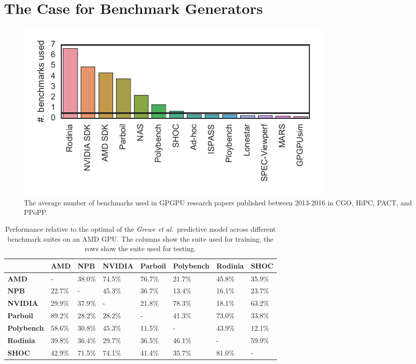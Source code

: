 \section{The Case for Benchmark Generators}%
\label{subsec:the-case-for-benchmark-generators}

\begin{figure}[t]
  \includegraphics[width=\columnwidth]{img/motivation-c} %
  \caption{%
    The average number of benchmarks used in GPGPU research papers published between 2013-2016 in CGO, HiPC, PACT, and PPoPP.%
  }%
  \label{fig:benchmark-suite-distribution}
\end{figure}

\begin{table}
  \centering%
  \begin{tabular}{ R{1.5cm} C{1.5cm} C{1.5cm} C{1.5cm} C{1.5cm} C{1.5cm} C{1.5cm} C{1.5cm} }
    \toprule
    & \textbf{AMD} & \textbf{NPB} & \textbf{NVIDIA} & \textbf{Parboil} & \textbf{Polybench} & \textbf{Rodinia} & \textbf{SHOC}\\
    \midrule
    \textbf{AMD} & - & 38.0\% & 74.5\% & 76.7\% & 21.7\% & 45.8\% & 35.9\%\\
    \textbf{NPB} & 22.7\% & - & 45.3\% & 36.7\% & 13.4\% & 16.1\% & 23.7\%\\
    \textbf{NVIDIA} & 29.9\% & 37.9\% & - & 21.8\% & 78.3\% & 18.1\% & 63.2\%\\
    \textbf{Parboil} & 89.2\% & 28.2\% & 28.2\% & - & 41.3\% & 73.0\% & 33.8\%\\
    \textbf{Polybench} & 58.6\% & 30.8\% & 45.3\% & 11.5\% & - & 43.9\% & 12.1\%\\
  \textbf{Rodinia} & 39.8\% & 36.4\% & 29.7\% & 36.5\% & 46.1\% & - & 59.9\%\\
  \textbf{SHOC} & 42.9\% & 71.5\% & 74.1\% & 41.4\% & 35.7\% & 81.0\% & -\\
  \end{tabular}
  \caption{Performance relative to the optimal of the \emph{Grewe et al.\ }predictive model across different benchmark suites on an AMD GPU. The columns show the suite used for training; the rows show the suite used for testing.}%
  \label{tab:cpu-gpu-benchmarks-crossvalidate}
\end{table}

